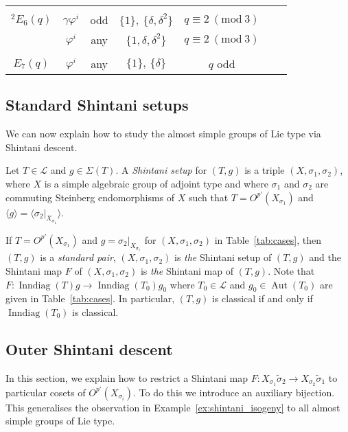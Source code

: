 \documentclass[11pt]{article}
\numberwithin{equation}{section}
\theoremstyle{shdefinition}
\theoremstyle{shplain}
\newcommand{\g}{\gamma}
\renewcommand{\d}{\delta}
\newcommand{\p}{\varphi}
\newcommand{\s}{\sigma}
\newcommand{\ws}{\widetilde{\sigma}}
\renewcommand{\L}{\mathcal{L}}
\newcommand{\<}{\langle}
\renewcommand{\>}{\rangle}
\newcommand{\Aut}{\operatorname{Aut}}
\newcommand{\Inndiag}{\operatorname{Inndiag}}
\renewcommand{\:}{\colon}
\renewcommand{\mod}[1]{\mathrm{ \ } (\mathrm{mod\ } #1)}
\begin{document}
\begin{table}
\begin{tabular}{ccccccc}
\hline\\[-9pt]
${}^2E_6(q)$     & $\g\p^i$ & odd        & $\{ 1 \},\ \{ \d, \d^2 \}$          & $q \equiv 2 \mod{3}$                  \\[5.5pt] 
                 & $\p^i$   & any        & $\{ 1, \d, \d^2 \}$                 & $q \equiv 2 \mod{3}$                  \\[5.5pt] 
\hline\\[-9pt]
$E_7(q)$         & $\p^i$   & any        & $\{ 1 \},\ \{ \d \}$                & $q$ odd                               \\[5.5pt] 
\hline
\end{tabular}
\end{table}


\subsection{Standard Shintani setups} \label{ss:lie_setup}

We can now explain how to study the almost simple groups of Lie type via Shintani descent.

Let $T \in \L$ and $g \in \Sigma(T)$. A \emph{Shintani setup} for $(T,g)$ is a triple $(X,\s_1,\s_2)$, where $X$ is a simple algebraic group of adjoint type and where $\s_1$ and $\s_2$ are commuting Steinberg endomorphisms of $X$ such that $T = O^{p'}(X_{\s_1})$ and $\<g\> = \<\s_2|_{X_{\s_1}}\>$. 

If $T = O^{p'}(X_{\s_1})$ and $g = \s_2|_{X_{\s_1}}$ for $(X,\s_1,\s_2)$ in Table~\ref{tab:cases}, then $(T,g)$ is a \emph{standard pair}, $(X,\s_1,\s_2)$ is \emph{the} Shintani setup of $(T,g)$ and the Shintani map $F$ of $(X,\s_1,\s_2)$ is \emph{the} Shintani map of $(T,g)$. Note that $F\:\Inndiag(T)g \to \Inndiag(T_0)g_0$ where $T_0 \in \L$ and $g_0 \in \Aut(T_0)$ are given in Table~\ref{tab:cases}. In particular, $(T,g)$ is classical if and only if $\Inndiag(T_0)$ is classical.


\subsection{Outer Shintani descent} \label{ss:lie_outer}

In this section, we explain how to restrict a Shintani map $F\:X_{\s_1}\ws_2 \to X_{\s_2}\ws_1$ to particular cosets of $O^{p'}(X_{\s_i})$. To do this we introduce an auxiliary bijection. This generalises the observation in Example~\ref{ex:shintani_isogeny} to all almost simple groups of Lie type.
\end{document}

